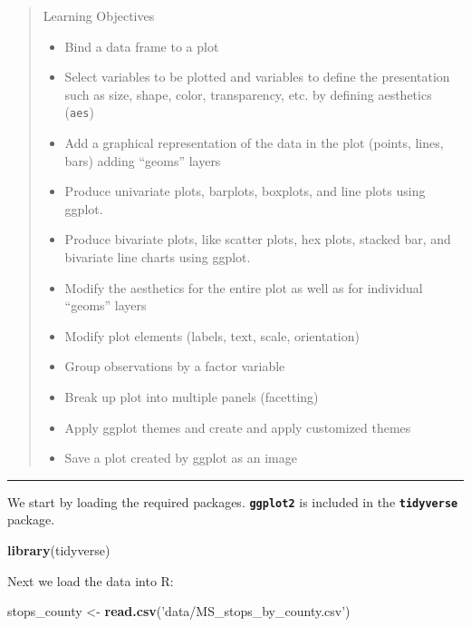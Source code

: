 \documentclass[]{book}
\newenvironment{Shaded}{\begin{snugshade}}{\end{snugshade}}
\newcommand{\KeywordTok}[1]{\textcolor[rgb]{0.13,0.29,0.53}{\textbf{#1}}}
\newcommand{\StringTok}[1]{\textcolor[rgb]{0.31,0.60,0.02}{#1}}
\newcommand{\NormalTok}[1]{#1}
\providecommand{\tightlist}{%
  \setlength{\itemsep}{0pt}\setlength{\parskip}{0pt}}
\theoremstyle{definition}
\theoremstyle{definition}
\theoremstyle{definition}
\theoremstyle{remark}
\begin{document}
\begin{quote}
Learning Objectives

\begin{itemize}
\tightlist
\item
  Bind a data frame to a plot
\item
  Select variables to be plotted and variables to define the
  presentation such as size, shape, color, transparency, etc. by
  defining aesthetics (\texttt{aes})
\item
  Add a graphical representation of the data in the plot (points, lines,
  bars) adding ``geoms'' layers
\item
  Produce univariate plots, barplots, boxplots, and line plots using
  ggplot.
\item
  Produce bivariate plots, like scatter plots, hex plots, stacked bar,
  and bivariate line charts using ggplot.
\item
  Modify the aesthetics for the entire plot as well as for individual
  ``geoms'' layers
\item
  Modify plot elements (labels, text, scale, orientation)
\item
  Group observations by a factor variable
\item
  Break up plot into multiple panels (facetting)
\item
  Apply ggplot themes and create and apply customized themes
\item
  Save a plot created by ggplot as an image
\end{itemize}
\end{quote}

\begin{center}\rule{0.5\linewidth}{\linethickness}\end{center}

We start by loading the required packages. \textbf{\texttt{ggplot2}} is
included in the \textbf{\texttt{tidyverse}} package.

\begin{Shaded}
\begin{Highlighting}[]
\KeywordTok{library}\NormalTok{(tidyverse)}
\end{Highlighting}
\end{Shaded}

Next we load the data into R:

\begin{Shaded}
\begin{Highlighting}[]
\NormalTok{stops_county <-}\StringTok{ }\KeywordTok{read.csv}\NormalTok{(}\StringTok{'data/MS_stops_by_county.csv'}\NormalTok{)}
\end{Highlighting}
\end{Shaded}
\end{document}
